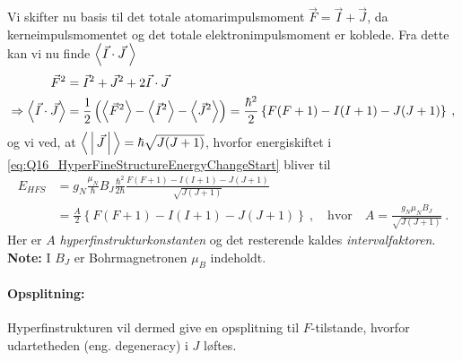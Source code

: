 Vi skifter nu basis til det totale atomarimpulsmoment $\vec{F} = \vec{I} + \vec{J}$, da kerneimpulsmomentet og det totale elektronimpulsmoment er koblede. Fra dette kan vi nu finde $\Braket{\vec{I} \cdot \vec{J} \:}$
\begin{align}
    \Vec{F}^2 &= \Vec{I}^2 + \Vec{J}^2 + 2\Vec{I} \cdot \Vec{J} \nonumber\\
    \Rightarrow \Braket{\Vec{I} \cdot \Vec{J}} &= \frac{1}{2} \left(\Braket{\Vec{F}^2} - \Braket{\Vec{I}^2} - \Braket{\Vec{J}^2}\right) = \frac{\hbar^2}{2} \left\{F(F+1) - I(I+1) - J(J+1)\right\} \: ,
\end{align}
og vi ved, at $\Braket{|\vec{J}|} = \hbar \sqrt{J(J+1)}$, hvorfor energiskiftet i \cref{eq:Q16_HyperFineStructureEnergyChangeStart} bliver til
\begin{align} \label{eq:Q16_HyperFineStructureEnergyChange}
    E_{HFS} &= g_N \frac{\mu_N}{\hbar} B_J \frac{\hbar^2}{2\hbar} \frac{F(F+1) - I(I+1) - J(J+1)}{\sqrt{J(J+1)}} \nonumber\\
    &= \frac{A}{2}\left\{F(F+1) - I(I+1) - J(J+1)\right\} \: , \quad \text{hvor} \quad A = \frac{g_N \mu_N B_J}{\sqrt{J(J+1)}} \: .
\end{align}
Her er $A$ \emph{hyperfinstrukturkonstanten} og det resterende kaldes \emph{intervalfaktoren}. \textbf{Note:} I $B_J$ er Bohrmagnetronen $\mu_B$ indeholdt.


\paragraph{Opsplitning:} Hyperfinstrukturen vil dermed give en opsplitning til $F$-tilstande, hvorfor udartetheden (eng. degeneracy) i $J$ løftes.\\

